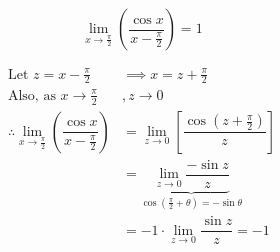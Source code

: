 \documentclass[14pt,fleqn]{extarticle}
\begin{document}
 

\begin{snippet}
    \incorrect
    
\[ \lim_{x\to\frac\pi{2}}\left(\dfrac{\cos x}{x-\frac\pi{2}}\right) = 1 \]
    
    \reason

\begin{align}
\text{Let }z = x-\frac\pi{2}&\implies x = z + \frac\pi{2} \\ 
\text{Also, as }x\to\frac\pi{2} &, z\to 0  \\
\therefore  \lim_{x\to\frac\pi{2}}\left(\dfrac{\cos x}{x-\frac\pi{2}}\right) &= 
\lim_{z\to 0}\left[\dfrac{\cos\left( z+\frac\pi{2}\right)}{z}\right] \\
&= \underbrace{\lim_{z\to 0}\dfrac{-\sin z}{z}}_{\cos\left(\frac\pi{2}+\theta\right) = -\sin\theta} \\
&= -1\cdot\lim_{z\to 0}\dfrac{\sin z}{z} = -1 
\end{align}   
 
\end{snippet} 
\end{document}

